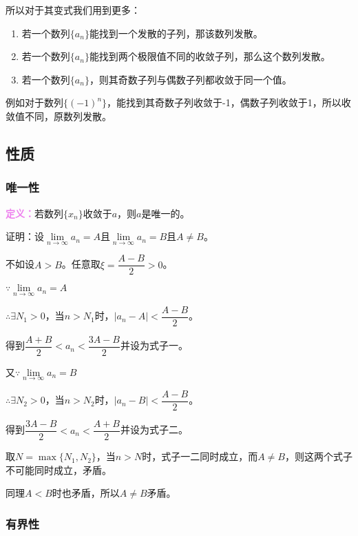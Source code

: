 \documentclass[UTF8, 12pt]{ctexart}
\begin{document}
        所以对于其变式我们用到更多：

        \begin{enumerate}
            \item 若一个数列$\{a_n\}$能找到一个发散的子列，那该数列发散。
            \item 若一个数列$\{a_n\}$能找到两个极限值不同的收敛子列，那么这个数列发散。
            \item 若一个数列$\{a_n\}$，则其奇数子列与偶数子列都收敛于同一个值。
        \end{enumerate}

        例如对于数列$\{(-1)^n\}$，能找到其奇数子列收敛于-1，偶数子列收敛于1，所以收敛值不同，原数列发散。

        \subsection{性质}
        \subsubsection{唯一性}

        \textcolor{violet}{\textbf{定义：}}若数列$\{x_n\}$收敛于$a$，则$a$是唯一的。

        证明：设$\lim\limits_{n\to\infty}a_n=A$且$\lim\limits_{n\to\infty}a_n=B$且$A\neq B$。

        不如设$A>B$。任意取$\xi=\dfrac{A-B}{2}>0$。

        $\because\lim\limits_{n\to\infty}a_n=A$

        $\therefore\exists N_1>0$，当$n>N_1$时，$\vert a_n-A\vert<\dfrac{A-B}{2}$。

        得到$\dfrac{A+B}{2}<a_n<\dfrac{3A-B}{2}$并设为式子一。

        又$\because\lim\limits_{n\to\infty}a_n=B$

        $\therefore\exists N_2>0$，当$n>N_2$时，$\vert a_n-B\vert<\dfrac{A-B}{2}$。

        得到$\dfrac{3A-B}{2}<a_n<\dfrac{A+B}{2}$并设为式子二。

        取$N=\max\{N_1,N_2\}$，当$n>N$时，式子一二同时成立，而$A\neq B$，则这两个式子不可能同时成立，矛盾。

        同理$A<B$时也矛盾，所以$A\neq B$矛盾。

        \subsubsection{有界性}
\end{document}
